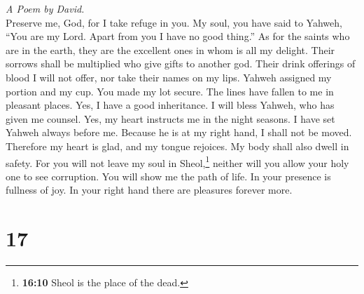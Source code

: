 \emph{A Poem by David.}\\
 Preserve me, God, for I take refuge in you.
 My soul, you have said to Yahweh, ``You are my Lord.
Apart from you I have no good thing.''  As for the saints
who are in the earth, they are the excellent ones in whom is all my
delight.  Their sorrows shall be multiplied who give gifts
to another god. Their drink offerings of blood I will not offer, nor
take their names on my lips.  Yahweh assigned my portion
and my cup. You made my lot secure.  The lines have fallen
to me in pleasant places. Yes, I have a good inheritance. 
I will bless Yahweh, who has given me counsel. Yes, my heart instructs
me in the night seasons.  I have set Yahweh always before
me. Because he is at my right hand, I shall not be moved. 
Therefore my heart is glad, and my tongue rejoices. My body shall also
dwell in safety.  For you will not leave my soul in
Sheol,\footnote{\textbf{16:10} Sheol is the place of the dead.} neither
will you allow your holy one to see corruption.  You will
show me the path of life. In your presence is fullness of joy. In your
right hand there are pleasures forever more.

\hypertarget{section-16}{%
\section{17}\label{section-16}}

